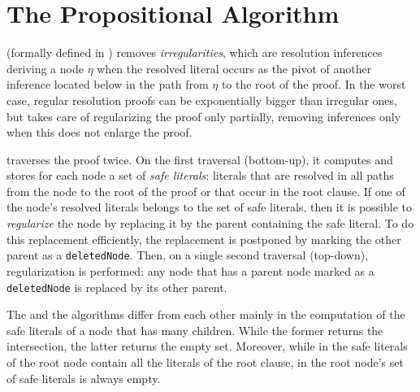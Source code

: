 \section{The Propositional Algorithm}\label{sec:rpi}

{\RPI} (formally defined in \cite{LURPI}) removes \emph{irregularities}, which are resolution inferences deriving a node $\eta$ when the resolved literal occurs as the pivot of another inference located below in the path from $\eta$ to the root of the proof. In the worst case, regular resolution proofs can be exponentially bigger than irregular ones, but {\RPI} takes care of regularizing the proof only partially, removing inferences only when this does not enlarge the proof.


{\RPI} traverses the proof twice. On the first traversal (bottom-up), it computes and stores for each node a set of \emph{safe literals}: literals that are resolved in all paths from the node to the root of the proof or that occur in the root clause. If one of the node's resolved literals belongs to the set of safe literals, then it is possible to \emph{regularize} the node by replacing it by the parent containing the safe literal. To do this replacement efficiently, the replacement is postponed by marking the other parent as a \texttt{deletedNode}. Then, on a single second traversal (top-down), regularization is performed: any node that has a parent node marked as a \texttt{deletedNode} is replaced by its other parent.


The {\RPI} and the {\RP} algorithms differ from each other mainly in the
computation of the safe literals of a node that has many children. While the former 
returns the intersection, 
the latter returns the empty set. 
Moreover, while in {\RPI} the safe literals of the root node contain all the literals of the root clause, in {\RP} the root node's set of safe literals is always empty. 